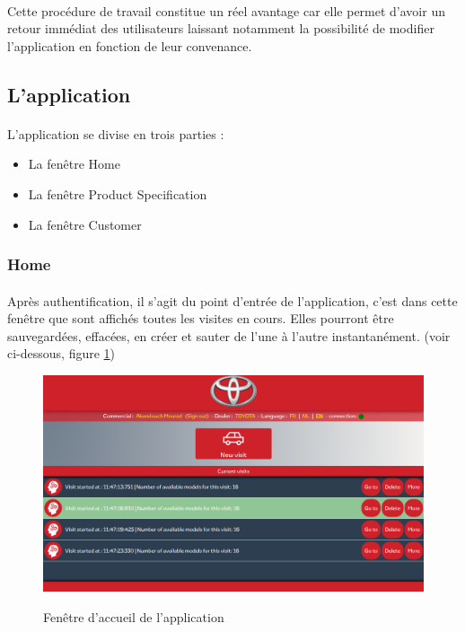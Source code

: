 \documentclass[12pt]{report}
\begin{document}
\paragraph{}
Cette procédure de travail constitue un réel avantage car elle permet d’avoir un retour immédiat des utilisateurs  laissant notamment la possibilité de modifier l’application en fonction de leur convenance. 

\subsection{L'application}
\paragraph{}
L'application se divise en trois parties :

\begin{itemize}
\item La fenêtre Home
\item La fenêtre Product Specification
\item La fenêtre Customer
\end{itemize}

\subsubsection*{Home}
\paragraph{}
Après authentification, il s'agit du point d'entrée de l'application, c'est dans cette fenêtre que sont affichés toutes les visites en cours. Elles pourront être sauvegardées, effacées, en créer et sauter de l'une à l'autre instantanément.
(voir ci-dessous, figure \ref{image_home})

\begin{figure}[H]
	\caption{Fenêtre d'accueil de l'application}
	\includegraphics[width=\linewidth]{img/image_home}
	\label{image_home}
\end{figure}
\end{document}
